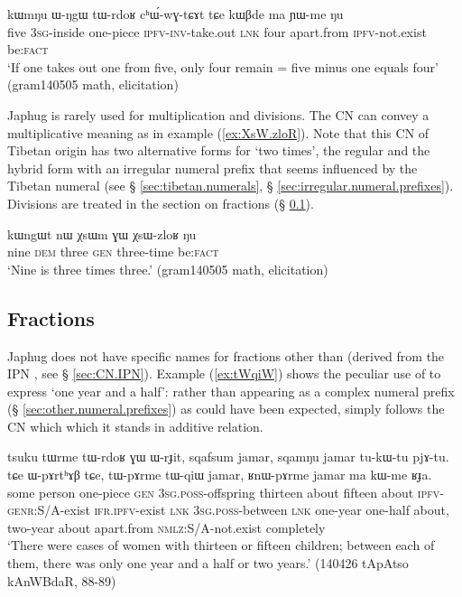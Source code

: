 {\begin{exe}
\ex \label{ex:tWrdoR.chWwGtCAt}
 \gll kɯmŋu ɯ-ŋgɯ tɯ-rdoʁ cʰɯ́-wɣ-tɕɤt tɕe kɯβde ma ɲɯ-me ŋu \\
 five \textsc{3sg}-inside one-piece \textsc{ipfv}-\textsc{inv}-take.out \textsc{lnk} four apart.from \textsc{ipfv}-not.exist be:\textsc{fact} \\
 \glt `If one takes out one from five, only four remain = five minus one equals four' (gram140505 math, elicitation)
\end{exe}

Japhug is rarely used for multiplication and divisions. The CN  can convey a multiplicative meaning  as in example (\ref{ex:XsW.zloR}). Note that this CN of Tibetan origin has two alternative forms for `two times', the regular   and the hybrid form  with an irregular numeral prefix that seems influenced by the Tibetan numeral  (see § \ref{sec:tibetan.numerals}, § \ref{sec:irregular.numeral.prefixes}). Divisions are treated in the section on fractions (§ \ref{sec:fractions}).

\begin{exe}
\ex \label{ex:XsW.zloR}
 \gll  kɯngɯt nɯ χsɯm ɣɯ χsɯ-zloʁ ŋu \\
 nine \textsc{dem} three \textsc{gen} three-time be:\textsc{fact} \\
  \glt `Nine is three times three.' (gram140505 math, elicitation)
\end{exe}
 
 
\subsection{Fractions} \label{sec:fractions}
Japhug does not have specific names for fractions other than  (derived from the IPN , see § \ref{sec:CN.IPN}). Example (\ref{ex:tWqiW}) shows the peculiar use of  to express `one year and a half': rather than appearing as a complex numeral prefix (§ \ref{sec:other.numeral.prefixes}) as could have been expected,    simply follows the CN  which which it stands in additive relation.

\begin{exe}
\ex \label{ex:tWqiW}
 \gll tsuku tɯrme tɯ-rdoʁ ɣɯ ɯ-rɟit, sqafsum jamar, sqamŋu jamar tu-kɯ-tu pjɤ-tu. tɕe ɯ-pɤrtʰɤβ tɕe, tɯ-pɤrme tɯ-qiɯ jamar, ʁnɯ-pɤrme jamar ma kɯ-me ʁɟa. \\
 some person one-piece \textsc{gen} \textsc{3sg}.\textsc{poss}-offspring thirteen about fifteen about \textsc{ipfv}-\textsc{genr}:S/A-exist \textsc{ifr}.\textsc{ipfv}-exist  \textsc{lnk} \textsc{3sg}.\textsc{poss}-between \textsc{lnk} one-year one-half about, two-year about apart.from \textsc{nmlz}:S/A-not.exist completely  \\
 \glt  `There were cases of women with thirteen or fifteen children; between each of them, there was only one year and a half or two years.' (140426 tApAtso kAnWBdaR, 88-89)
\end{exe}

}
